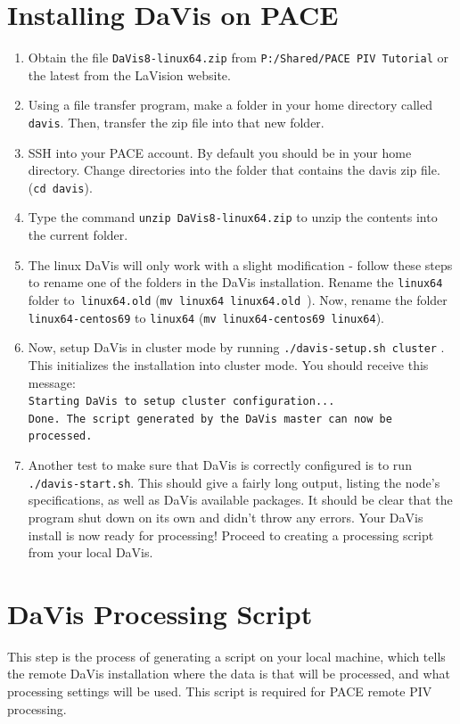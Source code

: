 \documentclass{article}
\begin{document}
	\section{Installing DaVis on PACE}
	\label{installdavis}
	\begin{enumerate}
		\item Obtain the file \texttt{DaVis8-linux64.zip} from \texttt{P:/Shared/PACE PIV Tutorial} or the latest from the LaVision website.
		\item Using a file transfer program, make a folder in your home directory called \texttt{davis}.  Then, transfer the zip file into that new folder.
		\item SSH into your PACE account.  By default you should be in your home directory.  Change directories into the folder that contains the davis zip file. (\texttt{cd davis}).
		\item Type the command \texttt{unzip DaVis8-linux64.zip} to unzip the contents into the current folder.
		\item The linux DaVis will only work with a slight modification - follow these steps to rename one of the folders in the DaVis installation.  Rename the \texttt{linux64} folder to\texttt{ linux64.old} (\texttt{mv linux64 linux64.old }).  Now, rename the folder \texttt{linux64-centos69} to \texttt{linux64} (\texttt{mv linux64-centos69 linux64}).
		\item Now, setup DaVis in cluster mode by running \texttt{./davis-setup.sh cluster} .  This initializes the installation into cluster mode.  You should receive this message: \\ \texttt{Starting DaVis to setup cluster configuration...\\Done. The script generated by the DaVis master can now be processed.}
		\item Another test to make sure that DaVis is correctly configured is to run \texttt{./davis-start.sh}.  This should give a fairly long output,  listing the node's specifications, as well as DaVis available packages.  It should be clear that the program shut down on its own and didn't throw any errors.  Your DaVis install is now ready for processing!  Proceed to creating a processing script from your local DaVis.
		
	\end{enumerate}
	
	\section{DaVis Processing Script}
	This step is the process of generating a script on your local machine, which tells the remote DaVis installation where the data is that will be processed, and what processing settings will be used.  This script is required for PACE remote PIV processing.
	
\end{document}
